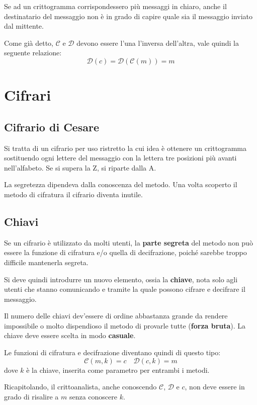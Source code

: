 Se ad un crittogramma corrispondessero pi\`u messaggi in chiaro, anche il destinatario del messaggio non \`e in grado
di capire quale sia il messaggio inviato dal mittente.

Come gi\`a detto, $\mathcal{C}$ e $\mathcal{D}$ devono essere l'una l'inversa dell'altra, vale quindi la seguente
relazione:
\[ \mathcal{D}(c) = \mathcal{D}(\mathcal{C}(m)) = m \]

\section{Cifrari}
\subsection{Cifrario di Cesare}
Si tratta di un cifrario per uso ristretto la cui idea \`e ottenere un crittogramma sostituendo ogni lettere del messaggio
con la lettera tre posizioni pi\`u avanti nell'alfabeto. Se si supera la Z, si riparte dalla A.

La segretezza dipendeva dalla conoscenza del metodo. Una volta scoperto il metodo di cifratura il cifrario diventa
inutile.

\subsection{Chiavi}
Se un cifrario \`e utilizzato da molti utenti, la \textbf{parte segreta} del metodo non pu\`o essere la funzione di
cifratura e/o quella di decifrazione, poich\'e sarebbe troppo difficile mantenerla segreta.

Si deve quindi introdurre un nuovo elemento, ossia la \textbf{chiave}, nota solo agli utenti che stanno comunicando e
tramite la quale possono cifrare e decifrare il messaggio.

Il numero delle chiavi dev'essere di ordine abbastanza grande da rendere impossibile o molto dispendioso il metodo di
provarle tutte (\textbf{forza bruta}). La chiave deve essere scelta in modo \textbf{casuale}.

Le funzioni di cifratura e decifrazione diventano quindi di questo tipo:
\[ \mathcal{C}(m, k) = c \quad \mathcal{D}(c, k) = m \]
dove $k$ \`e la chiave, inserita come parametro per entrambi i metodi.

Ricapitolando, il crittoanalista, anche conoscendo $\mathcal{C}$, $\mathcal{D}$ e $c$, non deve essere in grado di
risalire a $m$ senza conoscere $k$.

